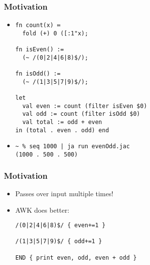 \documentclass{beamer}
\begin{document}


\begin{frame}[fragile]
  \frametitle{Motivation}
  \begin{itemize}
    \item
      \begin{verbatim}
fn count(x) ≔
  fold (+) 0 ([:1"x);

fn isEven() :=
  (~ /(0|2|4|6|8)$/);

fn isOdd() :=
  (~ /(1|3|5|7|9)$/);

let
  val even := count (filter isEven $0)
  val odd := count (filter isOdd $0)
  val total := odd + even
in (total . even . odd) end
      \end{verbatim}
    \item
      \begin{verbatim}
~ % seq 1000 | ja run evenOdd.jac
(1000 . 500 . 500)
      \end{verbatim}
  \end{itemize}
\end{frame}
\begin{frame}[fragile]
  \frametitle{Motivation}
  \begin{itemize}
    \item Passes over input multiple times!
    \item AWK does better:
      \begin{verbatim}
/(0|2|4|6|8)$/ { even+=1 } 

/(1|3|5|7|9)$/ { odd+=1 } 

END { print even, odd, even + odd }
      \end{verbatim}
  \end{itemize}
\end{frame}
\end{document}
